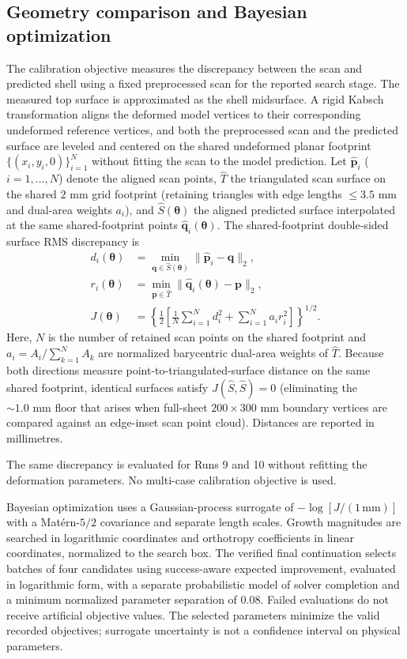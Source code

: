 \documentclass[11pt]{article}
\begin{document}
\subsection{Geometry comparison and Bayesian optimization}
The calibration objective measures the discrepancy between the scan and predicted shell using a fixed preprocessed scan for the reported search stage. The measured top surface is approximated as the shell midsurface. A rigid Kabsch transformation aligns the deformed model vertices to their corresponding undeformed reference vertices, and both the preprocessed scan and the predicted surface are leveled and centered on the shared undeformed planar footprint $\{(x_i,y_i,0)\}_{i=1}^{N}$ without fitting the scan to the model prediction. Let $\widehat{\mathbf p}_i$ ($i=1,\dots,N$) denote the aligned scan points, $\widehat T$ the triangulated scan surface on the shared $2\text{ mm}$ grid footprint (retaining triangles with edge lengths $\le 3.5\text{ mm}$ and dual-area weights $a_i$), and $\widehat S(\boldsymbol\theta)$ the aligned predicted surface interpolated at the same shared-footprint points $\widehat{\mathbf q}_i(\boldsymbol\theta)$. The shared-footprint double-sided surface RMS discrepancy is
\begin{align}
d_i(\boldsymbol\theta)&=\min_{\mathbf q\in\widehat S(\boldsymbol\theta)}
\|\widehat{\mathbf p}_i-\mathbf q\|_2,\\
r_i(\boldsymbol\theta)&=\min_{\mathbf p\in\widehat T}
\|\widehat{\mathbf q}_i(\boldsymbol\theta)-\mathbf p\|_2,\\
J(\boldsymbol\theta)&=\left\{\frac12\left[
\frac1N\sum_{i=1}^{N}d_i^2+\sum_{i=1}^{N}a_ir_i^2\right]\right\}^{1/2}.
\end{align}
Here, $N$ is the number of retained scan points on the shared footprint and $a_i=A_i/\sum_{k=1}^{N}A_k$ are normalized barycentric dual-area weights of $\widehat T$. Because both directions measure point-to-triangulated-surface distance on the same shared footprint, identical surfaces satisfy $J(\widehat S,\widehat S)=0$ (eliminating the $\sim 1.0\text{ mm}$ floor that arises when full-sheet $200\times 300\text{ mm}$ boundary vertices are compared against an edge-inset scan point cloud). Distances are reported in millimetres.

The same discrepancy is evaluated for Runs 9 and 10 without refitting the deformation parameters. No multi-case calibration objective is used.

Bayesian optimization uses a Gaussian-process surrogate of $-\log[J/(1\,\mathrm{mm})]$ with a Mat\'ern-$5/2$ covariance and separate length scales. Growth magnitudes are searched in logarithmic coordinates and orthotropy coefficients in linear coordinates, normalized to the search box. The verified final continuation selects batches of four candidates using success-aware expected improvement, evaluated in logarithmic form, with a separate probabilistic model of solver completion and a minimum normalized parameter separation of $0.08$. Failed evaluations do not receive artificial objective values. The selected parameters minimize the valid recorded objectives; surrogate uncertainty is not a confidence interval on physical parameters.
\end{document}
